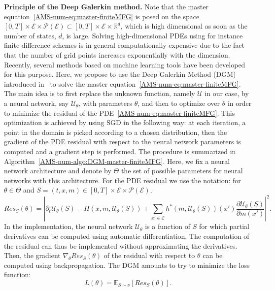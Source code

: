 \documentclass{amsproc}
\theoremstyle{definition}
\theoremstyle{remark}
\numberwithin{equation}{section}
\newcommand{\EE}{{\mathbb E}}
\newcommand{\RR}{{\mathbb R}}
\newcommand{\cE}{{\mathcal E}}
\newcommand{\cP}{{\mathcal P}}
\newcommand{\cU}{{\mathcal U}}
\begin{document}
\textbf{Principle of the Deep Galerkin method. } Note that the master equation~\eqref{AMS-num-eq:master-finiteMFG} is posed on the space $[0,T] \times \cE \times \cP(\cE) \subset [0,T] \times \cE \times \RR^d$, which is high dimensional as soon as the number of states, $d$, is large. Solving high-dimensional PDEs using for instance finite difference schemes is in general computationally expensive  due to the fact that the number of grid points increases exponentially with the dimension. Recently, several methods based on machine learning tools have been developed for this purpose. Here, we propose to use the Deep Galerkin Method (DGM) introduced in~\cite{MR3874585} to solve the master equation~\eqref{AMS-num-eq:master-finiteMFG}. The main idea is to first replace the unknown function, namely $\cU$ in our case, by a neural network, say $\cU_\theta$, with parameters $\theta$, and then to optimize over $\theta$ in order to minimize the residual of the PDE~\eqref{AMS-num-eq:master-finiteMFG}.  This optimization is achieved by using SGD in the following way: at each iteration, a point in the domain is picked according to a chosen distribution, then the gradient of the PDE residual with respect to the neural network parameters is computed and a gradient step is performed. The procedure is summarized in Algorithm~\ref{AMS-num-algo:DGM-master-finiteMFG}. Here, we fix a neural network architecture and denote by $\Theta$ the set of possible parameters for neural networks with this architecture. For the PDE residual we use the notation: for $\theta \in \Theta$ and $S = (t,x,m) \in [0,T] \times \cE \times \cP(\cE)$,
\begin{equation}
\label{AMS-num-eq:master-finiteMFG-residual}
	Res_S(\theta) = \left|\partial_t \cU_\theta(S) - H(x,m,\cU_\theta(S))
	+ \sum_{x' \in \cE} h^*(m ,\cU_\theta(S))(x') \frac{\partial \cU_\theta(S)}{\partial m(x')}\right|^2.
\end{equation}
In the implementation, the neural network $\cU_\theta$ is a function of $S$ for which partial derivatives can be computed using automatic differentiation.  The computation of the residual can thus be implemented without approximating the derivatives. Then, the gradient $\nabla_\theta Res_S(\theta)$ of the residual with respect to $\theta$ can be computed using backpropagation.  The DGM amounts to try to minimize the loss function:
$$
	L(\theta) = \EE_{S \sim \nu}\left[ Res_S(\theta) \right].
$$
\end{document}
